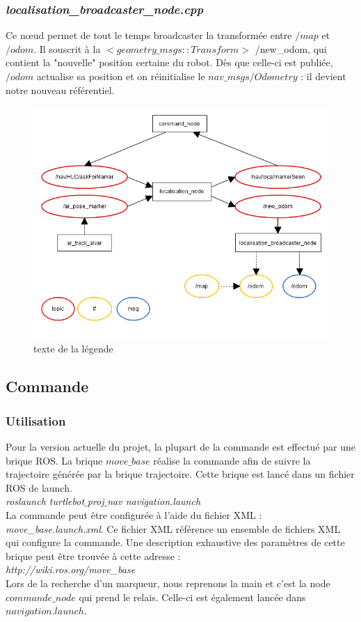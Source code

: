 \documentclass[10pt,a4paper]{article}
\begin{document}
\subsubsection{\textit{localisation\_broadcaster\_node.cpp}}

Ce nœud permet de tout le temps broadcaster la transformée entre $/map$ et $/odom$. Il souscrit à la $<geometry\_msgs::Transform>$ /new\_odom, qui contient la "nouvelle" position certaine du robot. Dès que celle-ci est publiée, $/odom$ actualise sa position et on réinitialise le $nav\_msgs/Odometry$ : il devient notre nouveau référentiel.

\begin{figure}
\center
\includegraphics[scale=0.6]{figures/rqt_loca.png} 
\caption{texte de la légende}	
\end{figure}




\subsection{Commande}
\label{sec:commande}
\subsubsection*{Utilisation}

Pour la version actuelle du projet, la plupart de la commande est effectué par une brique ROS. La brique $move\_base$ réalise la commande afin de suivre la trajectoire générée par la brique trajectoire. Cette brique est lancé dans un fichier ROS de launch.\\
\textit{roslaunch turtlebot$\_$proj$\_$nav navigation.launch}\\
La commande peut être configurée à l'aide du fichier XML : \textit{move\_base.launch.xml}. Ce fichier XML référence un ensemble de fichiers XML qui configure la commande. Une description exhaustive des paramètres de cette brique peut être trouvée à cette adresse :\\
\textit{http://wiki.ros.org/move\_base}\\
Lors de la recherche d'un marqueur, nous reprenons la main et c'est la node $commande\_node$ qui prend le relais. Celle-ci est également lancée dans $navigation.launch$.
\end{document}
